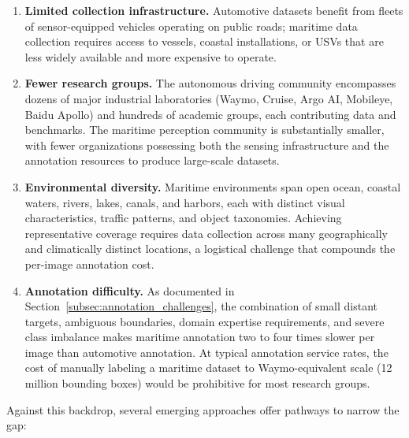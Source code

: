 \begin{enumerate}[leftmargin=*]
\item \textbf{Limited collection infrastructure.} Automotive datasets benefit from
    fleets of sensor-equipped vehicles operating on public roads; maritime data
    collection requires access to vessels, coastal installations, or USVs that are
    less widely available and more expensive to operate.

\item \textbf{Fewer research groups.} The autonomous driving community encompasses
    dozens of major industrial laboratories (Waymo, Cruise, Argo AI, Mobileye, Baidu
    Apollo) and hundreds of academic groups, each contributing data and benchmarks. The
    maritime perception community is substantially smaller, with fewer organizations
    possessing both the sensing infrastructure and the annotation resources to produce
    large-scale datasets.

\item \textbf{Environmental diversity.} Maritime environments span open ocean, coastal
    waters, rivers, lakes, canals, and harbors, each with distinct visual
    characteristics, traffic patterns, and object taxonomies. Achieving representative
    coverage requires data collection across many geographically and climatically
    distinct locations, a logistical challenge that compounds the per-image annotation
    cost.

\item \textbf{Annotation difficulty.} As documented in
    Section~\ref{subsec:annotation_challenges}, the combination of small distant
    targets, ambiguous boundaries, domain expertise requirements, and severe class
    imbalance makes maritime annotation two to four times slower per image than
    automotive annotation. At typical annotation service rates, the cost of manually
    labeling a maritime dataset to Waymo-equivalent scale (12 million bounding boxes)
    would be prohibitive for most research groups.
\end{enumerate}

Against this backdrop, several emerging approaches offer pathways to narrow the gap:

